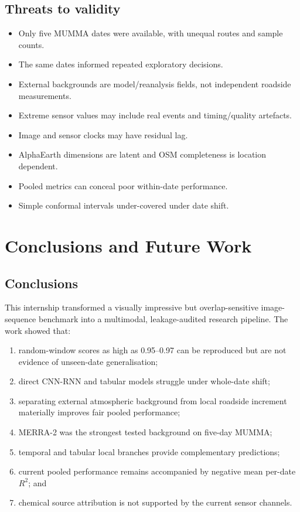 \documentclass[11pt,a4paper,oneside]{report}
\newcommand{\Rtwo}{$R^2$}
\begin{document}
\section{Threats to validity}
\begin{itemize}
  \item Only five MUMMA dates were available, with unequal routes and sample
        counts.
  \item The same dates informed repeated exploratory decisions.
  \item External backgrounds are model/reanalysis fields, not independent
        roadside measurements.
  \item Extreme sensor values may include real events and timing/quality
        artefacts.
  \item Image and sensor clocks may have residual lag.
  \item AlphaEarth dimensions are latent and OSM completeness is location
        dependent.
  \item Pooled metrics can conceal poor within-date performance.
  \item Simple conformal intervals under-covered under date shift.
\end{itemize}

\chapter{Conclusions and Future Work}

\section{Conclusions}
This internship transformed a visually impressive but overlap-sensitive
image-sequence benchmark into a multimodal, leakage-audited research pipeline.
The work showed that:
\begin{enumerate}
  \item random-window scores as high as 0.95--0.97 can be reproduced but are not
        evidence of unseen-date generalisation;
  \item direct CNN-RNN and tabular models struggle under whole-date shift;
  \item separating external atmospheric background from local roadside
        increment materially improves fair pooled performance;
  \item MERRA-2 was the strongest tested background on five-day MUMMA;
  \item temporal and tabular local branches provide complementary predictions;
  \item current pooled performance remains accompanied by negative mean
        per-date \Rtwo; and
  \item chemical source attribution is not supported by the current sensor
        channels.
\end{enumerate}
\end{document}
